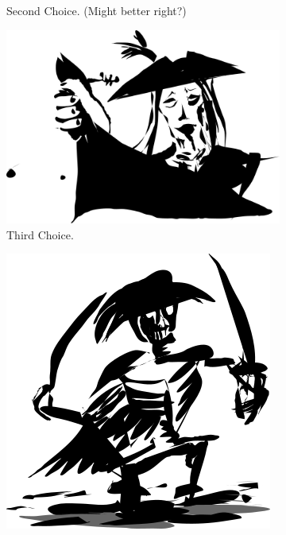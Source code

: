 \documentclass{article}
\begin{document}
\begin{figure}[H]
\begin{subfigure}[b]{0.3\linewidth}
    \caption{Second Choice. (Might better right?)}
  \end{subfigure}
  \begin{subfigure}[b]{0.4\linewidth}
    \includegraphics[width=\linewidth]{resources/pirates3.png}
    \caption{Third Choice.}
  \end{subfigure}
  \begin{subfigure}[b]{0.4\linewidth}
    \includegraphics[width=\linewidth]{resources/pirates4.png}

\end{subfigure}
\end{figure}
\end{document}
